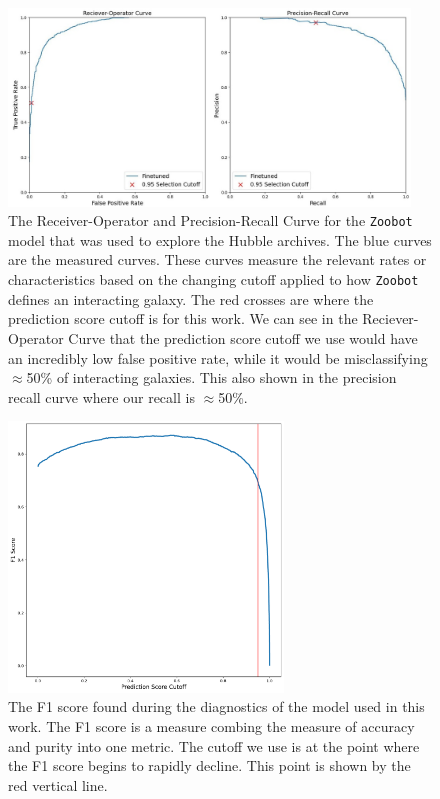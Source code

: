 \begin{figure}
  \centering
  \includegraphics[width = 0.95\textwidth]{Chapter2/figures/fig14.jpg}
  \caption{The Receiver-Operator and Precision-Recall Curve for the \texttt{Zoobot} model that was used to explore the Hubble archives. The blue curves are the measured curves. These curves measure the relevant rates or characteristics based on the changing cutoff applied to how \texttt{Zoobot} defines an interacting galaxy. The red crosses are where the prediction score cutoff is for this work. We can see in the Reciever-Operator Curve that the prediction score cutoff we use would have an incredibly low false positive rate, while it would be misclassifying $\approx$50\% of interacting galaxies. This also shown in the precision recall curve where our recall is $\approx$50\%.}
  \label{fig:pr-roc-curves}
\end{figure}

\begin{figure}
    \centering
    \includegraphics[width = 0.65\textwidth]{Chapter2/figures/fig15.pdf}
    \caption{The F1 score found during the diagnostics of the model used in this work. The F1 score is a measure combing the measure of accuracy and purity into one metric. The cutoff we use is at the point where the F1 score begins to rapidly decline. This point is shown by the red vertical line.}
    \label{fig:f1-score}
\end{figure}

